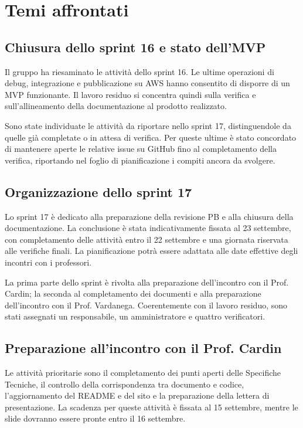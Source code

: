 \documentclass[12pt, a4paper]{article}
\begin{document}
\section{Temi affrontati}

\subsection{Chiusura dello sprint 16 e stato dell'MVP}
Il gruppo ha riesaminato le attività dello sprint 16. Le ultime operazioni di debug, integrazione e pubblicazione su AWS hanno consentito di disporre di un MVP funzionante. Il lavoro residuo si concentra quindi sulla verifica e sull'allineamento della documentazione al prodotto realizzato.

Sono state individuate le attività da riportare nello sprint 17, distinguendole da quelle già completate o in attesa di verifica. Per queste ultime è stato concordato di mantenere aperte le relative issue su GitHub fino al completamento della verifica, riportando nel foglio di pianificazione i compiti ancora da svolgere.

\subsection{Organizzazione dello sprint 17}
Lo sprint 17 è dedicato alla preparazione della revisione PB e alla chiusura della documentazione. La conclusione è stata indicativamente fissata al 23 settembre, con completamento delle attività entro il 22 settembre e una giornata riservata alle verifiche finali. La pianificazione potrà essere adattata alle date effettive degli incontri con i professori.

La prima parte dello sprint è rivolta alla preparazione dell'incontro con il Prof. Cardin; la seconda al completamento dei documenti e alla preparazione dell'incontro con il Prof. Vardanega. Coerentemente con il lavoro residuo, sono stati assegnati un responsabile, un amministratore e quattro verificatori.

\subsection{Preparazione all'incontro con il Prof. Cardin}
Le attività prioritarie sono il completamento dei punti aperti delle Specifiche Tecniche, il controllo della corrispondenza tra documento e codice, l'aggiornamento del README e del sito e la preparazione della lettera di presentazione. La scadenza per queste attività è fissata al 15 settembre, mentre le slide dovranno essere pronte entro il 16 settembre.
\end{document}
